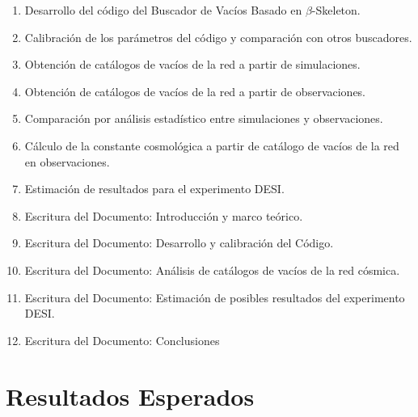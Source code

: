 \documentclass[preprint]{aastex62}
\begin{document}
  
  \begin{enumerate}
  \item Desarrollo del código del Buscador de Vacíos Basado en $\beta$-Skeleton.
  \item Calibración de los parámetros del código y comparación con otros buscadores.
  \item Obtención de catálogos de vacíos de la red a partir de simulaciones.
  \item Obtención de catálogos de vacíos de la red a partir de observaciones.
  \item Comparación por análisis estadístico entre simulaciones y observaciones.
  \item Cálculo de la constante cosmológica a partir de catálogo de vacíos de la red en
    observaciones.
  \item Estimación de resultados para el experimento DESI.
  \item Escritura del Documento: Introducción y marco teórico.
  \item Escritura del Documento: Desarrollo y calibración del Código.
  \item Escritura del Documento: Análisis de catálogos de vacíos de la red cósmica. 
  \item Escritura del Documento: Estimación de posibles resultados del experimento DESI.
  \item Escritura del Documento: Conclusiones
  \end{enumerate}
  
  
  \section{Resultados Esperados}

    
  \nocite{*}
\end{document}
